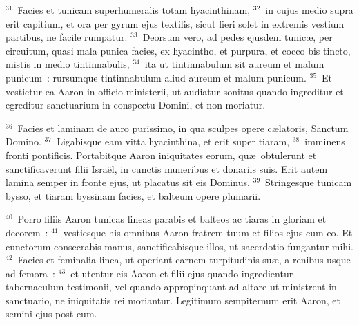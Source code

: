 ${}^{31}$~Facies et tunicam superhumeralis totam hyacinthinam,
${}^{32}$~in cujus medio supra erit capitium, et ora per gyrum ejus textilis, sicut fieri solet in extremis vestium partibus, ne facile rumpatur.
${}^{33}$~Deorsum vero, ad pedes ejusdem tunic\ae , per circuitum, quasi mala punica facies, ex hyacintho, et purpura, et cocco bis tincto, mistis in medio tintinnabulis,
${}^{34}$~ita ut tintinnabulum sit aureum et malum punicum~: rursumque tintinnabulum aliud aureum et malum punicum.
${}^{35}$~Et vestietur ea Aaron in officio ministerii, ut audiatur sonitus quando ingreditur et egreditur sanctuarium in conspectu Domini, et non moriatur.


${}^{36}$~Facies et laminam de auro purissimo, in qua sculpes opere c\ae latoris, Sanctum Domino.
${}^{37}$~Ligabisque eam vitta hyacinthina, et erit super tiaram,
${}^{38}$~imminens fronti pontificis. Portabitque Aaron iniquitates eorum, qu\ae\ obtulerunt et sanctificaverunt filii Isra\"el, in cunctis muneribus et donariis suis. Erit autem lamina semper in fronte ejus, ut placatus sit eis Dominus.
${}^{39}$~Stringesque tunicam bysso, et tiaram byssinam facies, et balteum opere plumarii.


${}^{40}$~Porro filiis Aaron tunicas lineas parabis et balteos ac tiaras in gloriam et decorem~:
${}^{41}$~vestiesque his omnibus Aaron fratrem tuum et filios ejus cum eo. Et cunctorum consecrabis manus, sanctificabisque illos, ut sacerdotio fungantur mihi.
${}^{42}$~Facies et feminalia linea, ut operiant carnem turpitudinis su\ae , a renibus usque ad femora~:
${}^{43}$~et utentur eis Aaron et filii ejus quando ingredientur tabernaculum testimonii, vel quando appropinquant ad altare ut ministrent in sanctuario, ne iniquitatis rei moriantur. Legitimum sempiternum erit Aaron, et semini ejus post eum.

